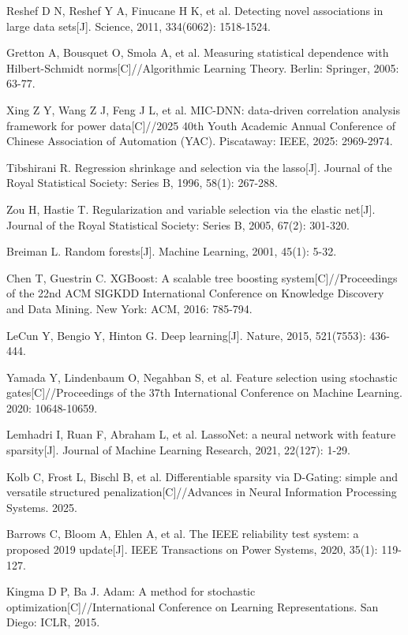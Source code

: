 Reshef D N, Reshef Y A, Finucane H K, et al. Detecting novel associations in large data sets[J]. Science, 2011, 334(6062): 1518-1524.

Gretton A, Bousquet O, Smola A, et al. Measuring statistical dependence with Hilbert-Schmidt norms[C]//Algorithmic Learning Theory. Berlin: Springer, 2005: 63-77.

Xing Z Y, Wang Z J, Feng J L, et al. MIC-DNN: data-driven correlation analysis framework for power data[C]//2025 40th Youth Academic Annual Conference of Chinese Association of Automation (YAC). Piscataway: IEEE, 2025: 2969-2974.

Tibshirani R. Regression shrinkage and selection via the lasso[J]. Journal of the Royal Statistical Society: Series B, 1996, 58(1): 267-288.

Zou H, Hastie T. Regularization and variable selection via the elastic net[J]. Journal of the Royal Statistical Society: Series B, 2005, 67(2): 301-320.

Breiman L. Random forests[J]. Machine Learning, 2001, 45(1): 5-32.

Chen T, Guestrin C. XGBoost: A scalable tree boosting system[C]//Proceedings of the 22nd ACM SIGKDD International Conference on Knowledge Discovery and Data Mining. New York: ACM, 2016: 785-794.

LeCun Y, Bengio Y, Hinton G. Deep learning[J]. Nature, 2015, 521(7553): 436-444.

Yamada Y, Lindenbaum O, Negahban S, et al. Feature selection using stochastic gates[C]//Proceedings of the 37th International Conference on Machine Learning. 2020: 10648-10659.

Lemhadri I, Ruan F, Abraham L, et al. LassoNet: a neural network with feature sparsity[J]. Journal of Machine Learning Research, 2021, 22(127): 1-29.

Kolb C, Frost L, Bischl B, et al. Differentiable sparsity via D-Gating: simple and versatile structured penalization[C]//Advances in Neural Information Processing Systems. 2025.

Barrows C, Bloom A, Ehlen A, et al. The IEEE reliability test system: a proposed 2019 update[J]. IEEE Transactions on Power Systems, 2020, 35(1): 119-127.

Kingma D P, Ba J. Adam: A method for stochastic optimization[C]//International Conference on Learning Representations. San Diego: ICLR, 2015.
